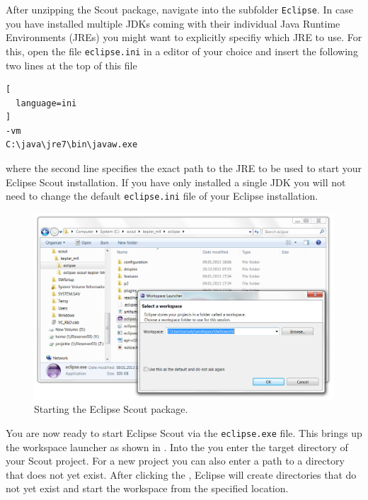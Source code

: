 \documentclass[a4paper,10pt,twoside]{book}
\begin{document}
After unzipping the Scout package, navigate into the subfolder \texttt{Eclipse}.
In case you have installed multiple JDKs coming with their individual Java Runtime Environments (JREs) you might want to explicitly specifiy which JRE to use.
For this, open the file \texttt{eclipse.ini} in a editor of your choice and insert the following two lines at the top of this file
\begin{lstlisting}[
  language=ini
]
-vm
C:\java\jre7\bin\javaw.exe
\end{lstlisting}
where the second line specifies the exact path to the JRE to be used to start your Eclipse Scout installation.
If you have only installed a single JDK you will not need to change the default \texttt{eclipse.ini} file of your Eclipse installation.

\begin{figure}
\includegraphics[width=15cm]{scout_startup_select_workspace.png}
\caption{Starting the Eclipse Scout package.}
\end{figure}

You are now ready to start Eclipse Scout via the \texttt{eclipse.exe} file. 
This brings up the workspace launcher as shown in .
Into the  you enter the target directory of your Scout project.
For a new project you can also enter a path to a directory that does not yet exist.
After clicking the , Eclipse will create directories that do not yet exist and start the workspace from the specified location.
\end{document}
